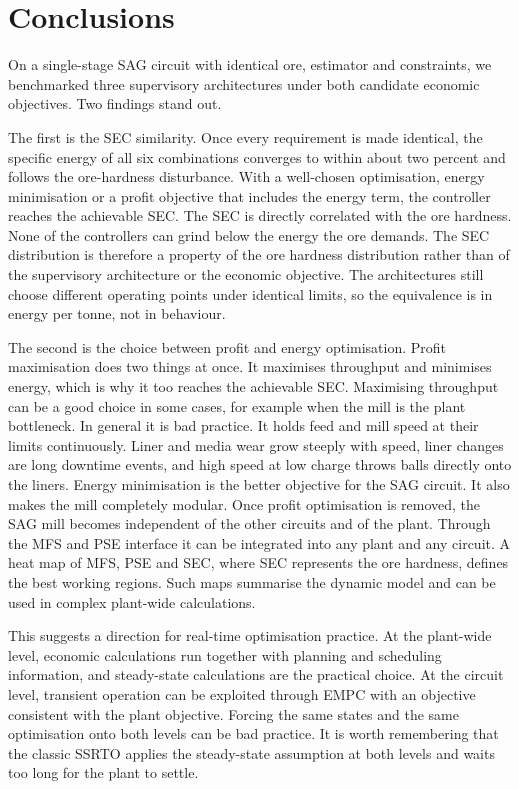 \documentclass[conference]{IEEEtran}
\begin{document}
\section{Conclusions}

On a single-stage SAG circuit with identical ore, estimator and
constraints, we benchmarked three supervisory architectures under both
candidate economic objectives. Two findings stand out.

The first is the SEC similarity. Once every requirement is made
identical, the specific energy of all six combinations converges to
within about two percent and follows the ore-hardness disturbance. With
a well-chosen optimisation, energy minimisation or a profit objective
that includes the energy term, the controller reaches the achievable
SEC. The SEC is directly correlated with the ore hardness.
None of the controllers can grind below the energy the ore demands. The
SEC distribution is therefore a property of the ore hardness
distribution rather than of the supervisory architecture or the
economic objective. The architectures still choose different
operating points under identical limits, so the equivalence is in energy
per tonne, not in behaviour.

The second is the choice between profit and energy optimisation. Profit
maximisation does two things at once. It maximises throughput and
minimises energy, which is why it too reaches the achievable SEC.
Maximising throughput can be a good choice in some cases, for example
when the mill is the plant bottleneck. In general it is bad practice. It
holds feed and mill speed at their limits continuously. Liner and media
wear grow steeply with speed, liner changes are long downtime events,
and high speed at low charge throws balls directly onto the liners.
Energy minimisation is the better objective for the SAG circuit. It also
makes the mill completely modular. Once profit optimisation is removed,
the SAG mill becomes independent of the other circuits and of the plant.
Through the MFS and PSE interface it can be integrated into any plant
and any circuit. A heat map of MFS, PSE and SEC, where SEC represents
the ore hardness, defines the best working regions. Such maps summarise
the dynamic model and can be used in complex plant-wide calculations.

This suggests a direction for real-time optimisation practice. At the
plant-wide level, economic calculations run together with planning and
scheduling information, and steady-state calculations are the practical
choice. At the circuit level, transient operation can be exploited
through EMPC with an objective consistent with the plant objective.
Forcing the same states and the same optimisation onto both levels can
be bad practice. It is worth remembering that the classic SSRTO applies
the steady-state assumption at both levels and waits too long for the
plant to settle.
\end{document}
